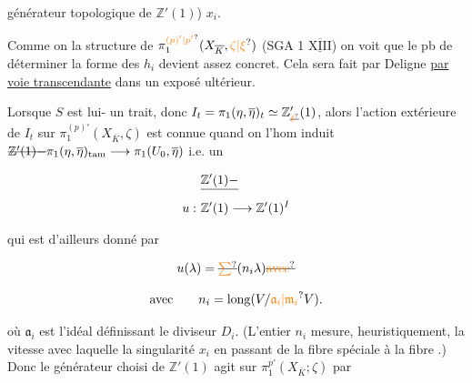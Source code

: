 générateur topologique de $\mathbb Z'(1)$)   $x_i$.

 Comme on  la structure de $\pi_1^{\unsure{(p)'|p'}}(X_{\overline K},\unsure{\zeta|\xi})$  (SGA 1 $\overline{\underline{\mathrm{XIII}}}$)  on voit que le pb de déterminer la forme des $h_i$ devient assez concret. Cela  sera fait par Deligne \uline{par voie transcendante} dans un exposé ultérieur.

Lorsque $S$ est lui-\unsure{$=$} un trait, donc  $I_t=\pi_1(\eta,\overline\eta)_t\simeq\mathbb Z'_{\deleted{\unsure{\ell}}}(1)$, alors l'action extérieure de $I_t$ sur $\pi_1^{(p)'}(X_{\overline K},\zeta)$ est connue quand on  l'hom induit $\deleted{\mathbb Z'(1)\mathbin{-}}\pi_1(\eta,\overline\eta)_{\mathrm{tam}}\longrightarrow\pi_1(U_0,\overline\eta)$ i.e. un 

\[
\begin{aligned}
&\deleted{\mathbb Z'(1)\mathbin{-}}\\
u:\ &\mathbb Z'(1)\longrightarrow\mathbb Z'(1)^I
\end{aligned}
\]

 qui est d'ailleurs donné par

\[
u(\lambda)=\deleted{\unsure{\sum}}(n_i\lambda)\deleted{\unsure{\text{avec}}}
\]

\[
\text{avec}\qquad n_i=\operatorname{long}(V/\unsure{\mathfrak a_i|\mathfrak m_i}V).
\]

où $\mathfrak a_i$ est l'idéal définissant le diviseur $D_i$. (L'entier $n_i$ mesure,  heuristiquement, la vitesse avec laquelle  la singularité $x_i$ en passant de la fibre spéciale à la fibre .) Donc le générateur choisi de $\mathbb Z'(1)$ agit  sur $\pi_1^{p'}(X_{\overline K};\zeta)$ par

